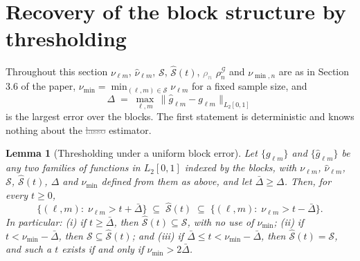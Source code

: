 \documentclass[10pt]{book}
\newtheorem{lemma}{Lemma}[section]
\theoremstyle{definition}
\newcommand{\cv}{\ell}
\newcommand{\md}{m}
\newcommand{\gcomp}[2]{g_{#1#2}}
\newcommand{\rhoG}{\rho^{\mathcal{G}}_{n}}
\begin{document}
{\color{colR1}
\section{Recovery of the block structure by thresholding}
\setcounter{equation}{0}

Throughout this section $\nu_{\cv\md}$, $\widehat{\nu}_{\cv\md}$, $\mathcal{S}$,
$\widehat{\mathcal{S}}(t)$, \textcolor{gray}{\sout{$\rho_n$}} $\rhoG$ and $\nu_{\min,n}$ are as in Section 3.6 of the paper,
$\nu_{\min} = \min_{(\cv,\md)\in \mathcal{S}}\nu_{\cv\md}$ for a fixed sample size, and
\[
  \Delta \;=\; \max_{\cv,\md}\,
  \bigl\lVert \widehat{g}_{\cv\md} - \gcomp{\cv}{\md} \bigr\rVert_{L_2[0,1]}
\]
is the largest error over the blocks. The first statement is deterministic
and knows nothing about the \textcolor{gray}{\sout{lasso}} estimator.

\begin{lemma}[Thresholding under a uniform block error]
\label{lem:sandwich}
Let $\{\gcomp{\cv}{\md}\}$ and $\{\widehat{g}_{\cv\md}\}$ be any two families
of functions in $L_2[0,1]$ indexed by the blocks, with $\nu_{\cv\md}$,
$\widehat{\nu}_{\cv\md}$, $\mathcal{S}$, $\widehat{\mathcal{S}}(t)$, $\Delta$ and $\nu_{\min}$ defined
from them as above, and let $\bar{\Delta} \ge \Delta$. Then, for every $t \ge 0$,
\begin{equation}
  \label{eq:sandwich}
  \bigl\{(\cv,\md) :\; \nu_{\cv\md} > t + \bar{\Delta}\bigr\}
  \;\subseteq\; \widehat{\mathcal{S}}(t) \;\subseteq\;
  \bigl\{(\cv,\md) :\; \nu_{\cv\md} > t - \bar{\Delta}\bigr\} .
\end{equation}
In particular: (i) if $t \ge \bar{\Delta}$, then $\widehat{\mathcal{S}}(t) \subseteq \mathcal{S}$, with no
use of $\nu_{\min}$; (ii) if $t < \nu_{\min} - \bar{\Delta}$, then $\mathcal{S} \subseteq \widehat{\mathcal{S}}(t)$;
and (iii) if $\bar{\Delta} \le t < \nu_{\min} - \bar{\Delta}$, then $\widehat{\mathcal{S}}(t) = \mathcal{S}$, and such a $t$
exists if and only if $\nu_{\min} > 2\bar{\Delta}$.
\end{lemma}

}
\end{document}
